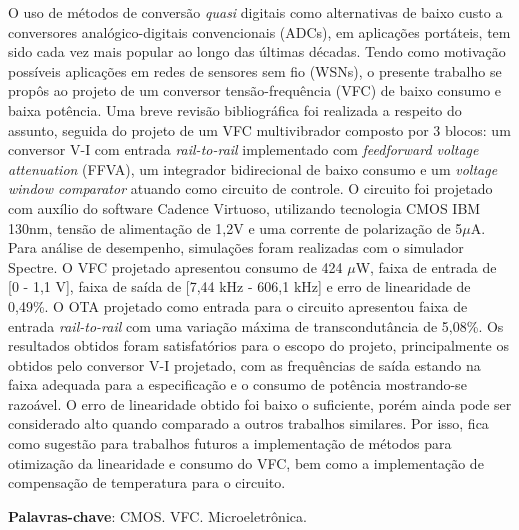 \documentclass[
	12pt,				%
	oneside,			%
	a4paper,			%
	english,			%
	french,				%
	spanish,			%
	brazil				%
	]{abntex2}
\begin{document}
\setlength{\absparsep}{18pt} %
\begin{resumo}
O uso de métodos de conversão \textit{quasi} digitais como alternativas de baixo custo a conversores analógico-digitais convencionais (ADCs), em aplicações portáteis, tem sido cada vez mais popular ao longo das últimas décadas. Tendo como motivação possíveis aplicações em redes de sensores sem fio (WSNs), o presente trabalho se propôs ao projeto de um conversor tensão-frequência (VFC) de baixo consumo e baixa potência. Uma breve revisão bibliográfica foi realizada a respeito do assunto, seguida do projeto de um VFC multivibrador composto por 3 blocos: um conversor V-I com entrada \textit{rail-to-rail} implementado com \textit{feedforward voltage attenuation} (FFVA), um integrador bidirecional de baixo consumo e um \textit{voltage window comparator} atuando como circuito de controle. O circuito foi projetado com auxílio do software Cadence Virtuoso, utilizando tecnologia CMOS IBM 130nm, tensão de alimentação de 1,2V e uma corrente de polarização de 5$\mu$A. Para análise de desempenho, simulações foram realizadas com o simulador Spectre. O VFC projetado apresentou consumo de 424 $\mu$W, faixa de entrada de [0 - 1,1 V], faixa de saída de [7,44 kHz - 606,1 kHz] e erro de linearidade de 0,49\%. O OTA projetado como entrada para o circuito apresentou faixa de entrada \textit{rail-to-rail} com uma variação máxima de transcondutância de 5,08\%. Os resultados obtidos foram satisfatórios para o escopo do projeto, principalmente os obtidos pelo conversor V-I projetado, com as frequências de saída estando na faixa adequada para a especificação e o consumo de potência mostrando-se razoável. O erro de linearidade obtido foi baixo o suficiente, porém ainda pode ser considerado alto quando comparado a outros trabalhos similares. Por isso, fica como sugestão para trabalhos futuros a implementação de métodos para otimização da linearidade e consumo do VFC, bem como a implementação de compensação de temperatura para o circuito.       

 \textbf{Palavras-chave}: CMOS. VFC. Microeletrônica. 
\end{resumo}
\end{document}
